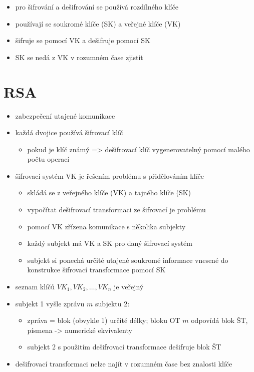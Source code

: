 \documentclass{szzclass}
\author{Jakub Rathouský}
\begin{document}
\tableofcontents
\newpage

\begin{itemize}
    \item pro šifrování a dešifrování se používá rozdílného klíče
    \item používají se soukromé klíče (SK) a veřejné klíče (VK)
    \item šifruje se pomocí VK a dešifruje pomocí SK
    \item SK se nedá z VK v rozumném čase zjistit
\end{itemize}
\section{RSA}
\begin{itemize}
    \item zabezpečení utajené komunikace
    \item každá dvojice používá šifrovací klíč
    \begin{itemize}
        \item pokud je klíč známý => dešifrovací klíč vygenerovatelný pomocí malého počtu operací
    \end{itemize}
    \item šifrovací systém VK je řešením problému s přidělováním klíče
    \begin{itemize}
        \item skládá se z veřejného klíče (VK) a tajného klíče (SK)
        \item vypočítat dešifrovací transformaci ze šifrovací je problému
        \item pomocí VK zřízena komunikace s několika subjekty
        \item každý subjekt má VK a SK pro daný šifrovací systém
        \item subjekt si ponechá určité utajené soukromé informace vnesené do konstrukce šifrovací transformace pomocí SK
    \end{itemize}
    \item seznam klíčů $VK_1, VK_2,\dots,VK_n$ je veřejný
    \item subjekt 1 vyšle zprávu $m$ subjektu 2:
    \begin{itemize}
        \item zpráva = blok (obvykle 1) určité délky; bloku OT $m$ odpovídá blok ŠT, písmena -> numerické ekvivalenty
        \item subjekt 2 s použitím dešifrovací transformace dešifruje blok ŠT
    \end{itemize}
    \item dešifrovací transformaci nelze najít v rozumném čase bez znalosti klíče
\end{itemize}
\end{document}
